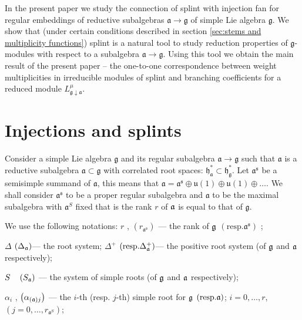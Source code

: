 \documentclass[12pt]{article}
\begin{document}
In the present paper we study the connection of splint with
injection fan for regular embeddings of reductive subalgebras
${\mathfrak a}\longrightarrow {\mathfrak g}$ of simple Lie algebra $\mathfrak{g}$. We show that (under
certain conditions described in section \ref{sec:stems and
multiplicity functions}) splint is a natural tool to study
reduction properties of ${\mathfrak g}$-modules
with respect to a subalgebra ${\mathfrak a}\longrightarrow
{\mathfrak g}$. Using this tool we obtain the main result of the
present paper -- the one-to-one correspondence between weight
multiplicities in irreducible modules of splint and branching
coefficients for a reduced module $L^{\mu}_{{\mathfrak
g}\downarrow {\mathfrak a}}$.


\section{Injections and splints}

\label{sec:Injections and splints}

Consider a simple Lie algebra $\mathfrak{g}$ and its regular subalgebra $%
\mathfrak{a}\longrightarrow \mathfrak{g}$ such that $\mathfrak{a}$
is a
reductive subalgebra $\mathfrak{a \subset g}$ with correlated root spaces: $%
\mathfrak{h}_{\mathfrak{a}}^{\ast }\subset \mathfrak{h}_{\mathfrak{g }%
}^{\ast }$. Let $\mathfrak{a}^{\mathfrak{s}}$ be a semisimple summand of
$\mathfrak{a}$,
this means that $\mathfrak{a}=\mathfrak{a}^{\mathfrak{s}} \oplus \mathfrak{u}(1)\oplus %
\mathfrak{u}(1)\oplus \dots$. We shall consider $\mathfrak{a}^{\mathfrak{s}}$
to be a proper regular subalgebra and $\mathfrak{a}$ to be the
maximal subalgebra with $\mathfrak{a}^S$ fixed that is the rank
$r$ of $\frak{a}$ is equal to that of $\mathfrak{g}$.

We use the following notations:
$r$ , $\left( r_{\mathfrak{a}^{\mathfrak{s}}}\right) $ --- the rank of
$\frak{g}$ $\left( \mathrm{{resp. }\mathfrak{a}^{\mathfrak{s}}}\right) $ ;

$\Delta $ $\left( \Delta _{\frak{a}}\right) $--- the root system;
$\Delta ^{+} $ $\left( \mathrm{{resp. }\Delta
_{\frak{a}}^{+}}\right) $--- the positive root system (of
$\frak{g}$ and $\frak{a}$ respectively);

$S\quad \left( S_{\frak{a}}\right) $ --- the system of simple roots (of $%
\frak{g}$ and $\frak{a}$ respectively);

$\alpha _{i}$ , $\left( \alpha _{\left( \frak{a}\right) j}\right) $ --- the $%
i$-th (resp. $j$-th) simple root for $\frak{g}$ $\left( \mathrm{{resp.}\frak{%
a}}\right) $; $i=0,\ldots ,r$,\ \ $\left( j=0,\ldots ,r_{\mathfrak{a}%
^S}\right) $;
\end{document}
